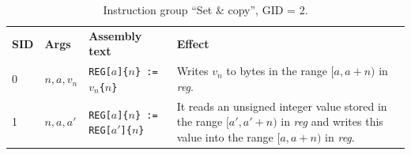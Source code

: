 \documentclass[10pt,twocolumn]{article}
\begin{document}
\begin{table}[!h]
\begin{center}
\def\arraystretch{1.5}
\begin{tabular}{lp{1.2cm}p{5.5cm}p{7.5cm}}
\textbf{SID} & \textbf{Args} & \textbf{Assembly text} & \textbf{Effect}
\\

0 & $ n,a,v_n $ %
& \texttt{REG[}$ a $\texttt{]\{}$ n $\texttt{\} := }$ v_n $\texttt{\{}$ n
$\texttt{\}} %
& Writes $ v_n $ to bytes in the range $ [a,a+n) $ in \textit{reg}.
\\

1 & $ n,a,a' $ %
& \texttt{REG[}$ a $\texttt{]\{}$ n $\texttt{\} := REG[}$ a' $\texttt{]\{}$ n
$\texttt{\}} %
& It reads an unsigned integer value stored in the range $ [a',a'+n) $ in
\textit{reg} and writes this value into the range $ [a,a+n) $ in \textit{reg}.
\\

\end{tabular}
\end{center}
\caption{Instruction group ``Set \& copy'', GID = 2.}
\label{tab:igroup:setandcopy}
\end{table}


\end{document}
